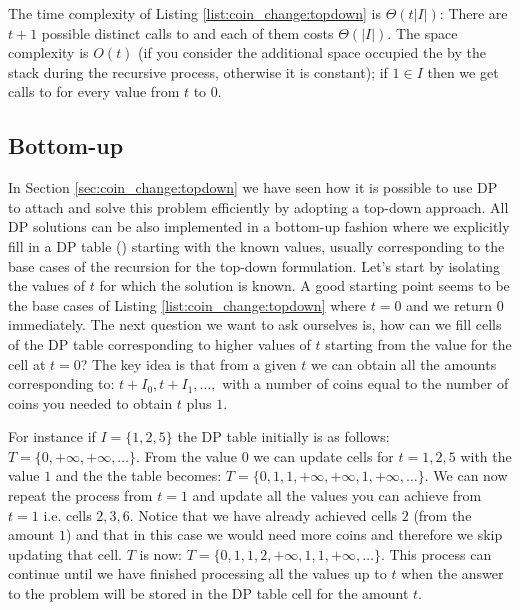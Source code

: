 

The time complexity of Listing \ref{list:coin_change:topdown} is $\Theta(t|I|)$: There are $t+1$ possible  distinct calls to  and each of them costs 
$\Theta(|I|)$. The space complexity is $O(t)$ (if you consider the additional space occupied the  by the stack during the recursive process, otherwise it is constant); if $1 \in I$ then we get calls to  for every value from $t$ to $0$.

\subsection{Bottom-up}
\label{coin_change:sec:bottomup}
In Section \ref{sec:coin_change:topdown} we have seen how it is possible to use DP to attach and solve this problem efficiently by adopting a top-down approach. All DP solutions can be also implemented in a bottom-up fashion where we explicitly fill in a DP table () starting with the known values, usually corresponding to the base cases of the recursion for the top-down formulation.
Let's start by isolating the values of $t$ for which the solution is known. 
A good starting point seems to be the base cases of Listing \ref{list:coin_change:topdown} where $t=0$ and we return $0$ immediately. The next question we want to ask ourselves is, how can we fill cells of the DP table corresponding to higher values of $t$ starting from the value for the cell at $t=0$? The key idea is that from a given $t$ we can obtain all the amounts corresponding to: $t+I_0,t+I_1,\ldots,  $ with a number of coins equal to the number of coins you needed to obtain $t$ plus $1$.

For instance if $I=\{1,2,5\}$ the DP table  initially is as follows: $T=\{0,+\infty,+\infty,\ldots\}$.
From the value $0$ we can update cells for $t=1,2,5$ with the value $1$ and the the table becomes: $T=\{0,1,1,+\infty,+\infty,1,+\infty,\ldots\}$.
We can now repeat the process from $t=1$ and update all the values you can achieve from $t=1$ i.e. cells $2,3,6$. Notice that we have already achieved cells $2$ (from the amount $1$) and that in this case we would need more coins and therefore we skip updating that cell. $T$ is now: $T=\{0,1,1,2,+\infty,1,1,+\infty,\ldots\}$.
This process can continue until we have finished processing all the values up to $t$ when the answer to the problem will be stored in the DP table cell for the amount $t$. 

